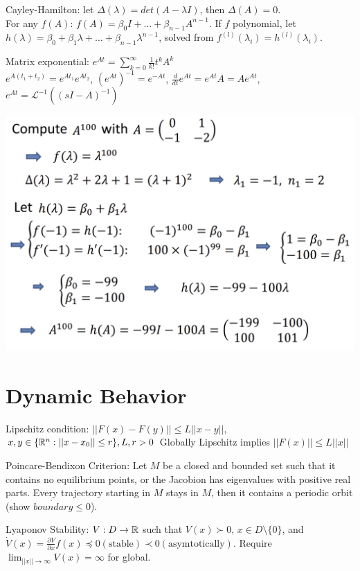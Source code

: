 \documentclass[11pt]{article}
\begin{document}
Cayley-Hamilton: let $\Delta(\lambda) = det(A - \lambda I)$, then $\Delta(A) = 0$.\\
For any $f(A)$: $f(A) = \beta_0 I + \dots + \beta_{n-1}A^{n-1}$.
If $f$ polynomial, let $h(\lambda) = \beta_0 + \beta_1 \lambda + \dots + \beta_{n-1} \lambda ^{n-1}$,
solved from $f^{(l)}(\lambda_i) = h^{(l)}(\lambda_i)$.

Matrix exponential: $e^{At} = \sum_{k=0}^\infty \frac{1}{k!} t^k A^k$\\
$e^{A(t_1 + t_2)} = e^{At_1}e^{At_2}$, $(e^{At})^{-1} = e^{-At}$, $\frac{d}{dt} e^{At} = e^{At}A = A e^{At}$,
$e^{At} = \mathcal{L}^{-1}((sI - A)^{-1})$

\begin{center}
    \includegraphics[width=0.9\linewidth]{cayleyhamilton.png}
\end{center}

\section{Dynamic Behavior}
Lipschitz condition: $||F(x) - F(y)|| \leq L ||x - y||$, $x,y \in \{\mathbb{R}^n: ||x-x_0|| \leq r \}, L,r > 0$
Globally Lipschitz implies $||F(x)|| \leq L ||x||$

Poincare-Bendixon Criterion: Let $M$ be a closed and bounded set such that it contains no equilibrium points, or the Jacobion has eigenvalues with positive real parts.
Every trajectory starting in $M$ stays in $M$, then it contains a periodic orbit (show $\dot{boundary} \leq 0$).

Lyaponov Stability: $V: D \to \mathbb{R}$ such that $V(x)\succ 0$, $x \in D \setminus \{0\}$,
and $\dot{V}(x) = \frac{\partial V}{\partial x} f(x) \preceq 0 (\text{stable}) \prec 0 (\text{asymtotically})$.
Require $\lim_{||x|| \to \infty} V(x) = \infty$ for global.
\end{document}
